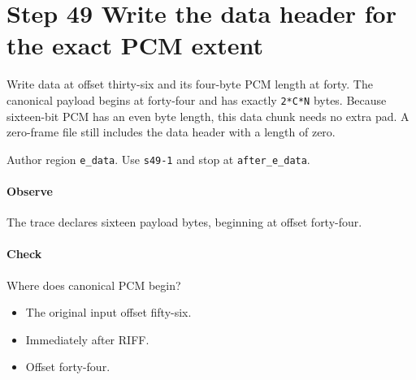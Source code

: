 \section{Step 49 Write the data header for the exact PCM extent}\label{pcm-wav-s49}
Write data at offset thirty-six and its four-byte PCM length at forty. The canonical payload begins at forty-four and has exactly \texttt{2*C*N} bytes. Because sixteen-bit PCM has an even byte length, this data chunk needs no extra pad. A zero-frame file still includes the data header with a length of zero.

Author region \texttt{e\_data}. Use \texttt{s49-1} and stop at \texttt{after\_e\_data}.

\paragraph{Observe} The trace declares sixteen payload bytes, beginning at offset forty-four.

\paragraph{Check} Where does canonical PCM begin?
\begin{itemize}
  \item[A.] The original input offset fifty-six.
  \item[B.] Immediately after RIFF.
  \item[C.] Offset forty-four.
\end{itemize}
